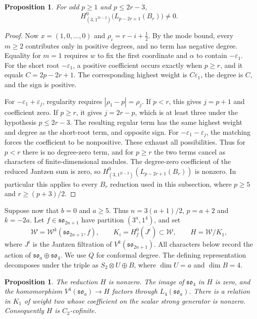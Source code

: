 \documentclass[11pt,a4paper]{amsart}
\numberwithin{equation}{section}
\newtheorem{proposition}[theorem]{Proposition}
\theoremstyle{definition}
\theoremstyle{remark}
\begin{document}
\begin{proposition}\label{B:uniform-tail-survival}
For odd $p\geq1$ and $p\leq2r-3$,
$$
 H^0_{(3,1^{2r-2})}\bigl(L_{p-2r+1}(B_r)\bigr)\ne0.
$$
\end{proposition}
\begin{proof}
Now $x=(1,0,\ldots,0)$ and $\rho_i=r-i+\tfrac12$.
By the mode bound, every $m\geq2$ contributes only in positive
degrees, and no term has negative degree. Equality for $m=1$ requires
$w$ to fix the first coordinate and $\alpha$ to contain
$-\varepsilon_1$.
For the short root $-\varepsilon_1$, a positive coefficient occurs
exactly when $p\geq r$, and it equals $C=2p-2r+1$.
The corresponding highest weight is $C\varepsilon_1$, the
degree is $C$, and the sign is positive.

For $-\varepsilon_1+\varepsilon_j$, regularity requires
$|\rho_1-p|=\rho_j$. If $p<r$, this gives $j=p+1$ and coefficient
zero. If $p\geq r$, it gives $j=2r-p$, which is at least three
under the hypothesis $p\leq2r-3$. The resulting regular term has
the same highest weight and degree as the short-root term, and
opposite sign. For $-\varepsilon_1-\varepsilon_j$, the matching
forces the coefficient to be nonpositive. These exhaust all
possibilities.
Thus for $p<r$ there is no degree-zero term, and for $p\geq r$ the two
terms cancel as characters of finite-dimensional modules. The degree-zero coefficient of the reduced Jantzen sum is zero,
so $H^0_{(3,1^{2r-2})}(L_{p-2r+1}(B_r))$ is nonzero.
In particular this applies to every $B_r$ reduction used in this subsection,
where $p\geq5$ and $r\geq(p+3)/2$.
\end{proof}

\medskip
Suppose now that $b=0$ and $a\geq5$. Thus $n=3(a+1)/2$,
$p=a+2$ and $k=-2a$.
Let $f\in\mathfrak{so}_{2n+1}$ have partition $(3^a,1^4)$, and set
$$
 \mathcal W=\mathcal W^k(\mathfrak{so}_{2n+1},f),\qquad
 K_i=H_f^0(J^i)\subset\mathcal W,\qquad H=\mathcal W/K_1,
$$
where $J^i$ is the Jantzen filtration of $V^k(\mathfrak{so}_{2n+1})$. All characters below record the action of
$\mathfrak{so}_a\oplus\mathfrak{so}_4$. We use $Q$ for conformal
degree. The defining representation decomposes under the triple as
$S_2\otimes U\oplus B$, where $\dim U=a$ and $\dim B=4$.

\begin{proposition}\label{B:boundary-relations}
The reduction $H$ is nonzero. The image of $\mathfrak{so}_4$ in $H$
is zero, and the homomorphism $V^4(\mathfrak{so}_a)\to H$ factors through
$L_4(\mathfrak{so}_a)$. There is a relation in $K_1$ of weight two
whose coefficient on the scalar strong generator is nonzero.
Consequently $H$ is $C_2$-cofinite.
\end{proposition}
\end{document}
